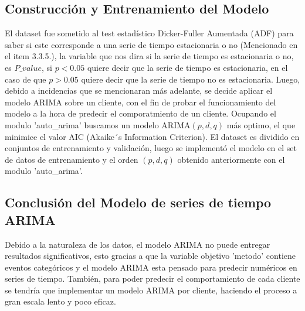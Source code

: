 \subsection{Construcción y Entrenamiento del Modelo}

El dataset fue sometido al test estadístico Dicker-Fuller Aumentada (ADF) para saber si este corresponde a una serie de tiempo estacionaria o no (Mencionado en el item 3.3.5.), la variable que nos dira si la serie de tiempo es estacionaria o no, es $P\_value$, si $p<0.05$ quiere decir que la serie de tiempo es estacionaria, en el caso de que $p>0.05$ quiere decir que la serie de tiempo no es estacionaria.
Luego, debido a incidencias que se mencionaran más adelante, se decide aplicar el modelo ARIMA sobre un cliente, con el fin de probar el funcionamiento del modelo a la hora de predecir el comporatmiento de un cliente. Ocupando el modulo 'auto\_arima' buscamos un modelo ARIMA$(p,d,q)$ más optimo, el que minimice el valor AIC (Akaike´s Information Criterion).
El dataset es dividido en conjuntos de entrenamiento y validación, luego se implementó el modelo en el set de datos de entrenamiento y el orden $(p,d,q)$ obtenido anteriormente con el modulo 'auto\_arima'.

\subsection{Conclusión del Modelo de series de tiempo ARIMA}

Debido a la naturaleza de los datos, el modelo ARIMA no puede entregar resultados significativos, esto gracias a que la variable objetivo 'metodo' contiene eventos categóricos y el modelo ARIMA esta pensado para predecir numéricos en series de tiempo. También, para poder predecir el comportamiento de cada cliente se tendría que implementar un modelo ARIMA por cliente, haciendo el proceso a gran escala lento y poco eficaz.

